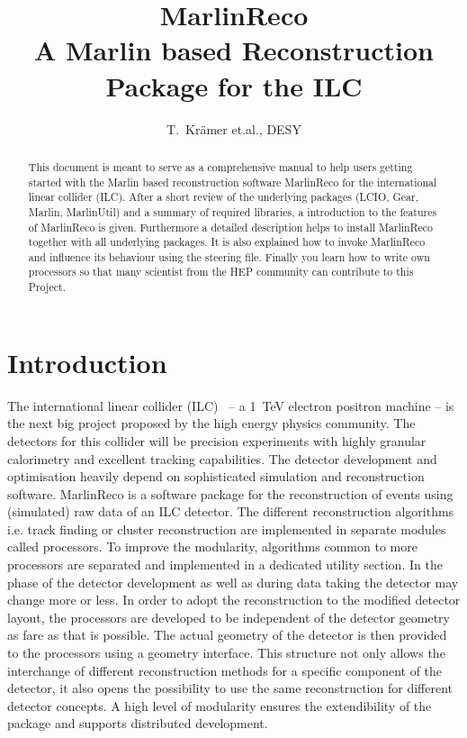 \title{\huge{\bf MarlinReco}\\
             A Marlin based Reconstruction Package for the ILC}
\author{T.~Kr\"amer et.al., DESY}
\maketitle

\begin{abstract}
This document is meant to serve as a comprehensive manual to help 
users getting started with the Marlin based reconstruction software MarlinReco
for the international linear collider (ILC). 
After a short review of the underlying packages 
(LCIO, Gear, Marlin, MarlinUtil) and a summary of required libraries,
a introduction to the features of MarlinReco is given. 
Furthermore a detailed description helps to install MarlinReco  
together with all underlying packages. It is also explained how
to invoke MarlinReco and influence its behaviour using the steering file.
Finally you learn how to write own processors so that many 
scientist from the HEP community can contribute to this Project.  
\end{abstract}
\newpage
\tableofcontents
\newpage

\section{Introduction}

The international linear collider (ILC)~\cite{ref_ilchome} --
a 1~TeV electron positron machine -- is the next big project proposed by
the high energy physics community. The detectors for this collider will be
precision experiments with highly granular calorimetry and excellent tracking
capabilities. The detector development and optimisation heavily depend on 
sophisticated simulation and reconstruction software.
MarlinReco is a software package for the reconstruction of events using 
(simulated) raw data of an ILC detector. The different reconstruction 
algorithms i.e. 
track finding or cluster reconstruction are implemented in separate modules 
called processors. To improve the modularity, algorithms 
common to more processors are separated and implemented in a dedicated 
utility section. In the phase of the detector development as well as
during data taking the detector may change more or less. In order to adopt 
the reconstruction to the modified detector layout, the processors are 
developed to be independent of the detector geometry as fare as that is 
possible. The actual geometry of the detector is then provided to the 
processors using a geometry interface. 
This structure not only allows the interchange of different
reconstruction methods for a specific component of the detector, it also opens
the possibility to use the same reconstruction for different 
detector concepts. A high level of modularity ensures the
extendibility of the package and supports distributed development.

